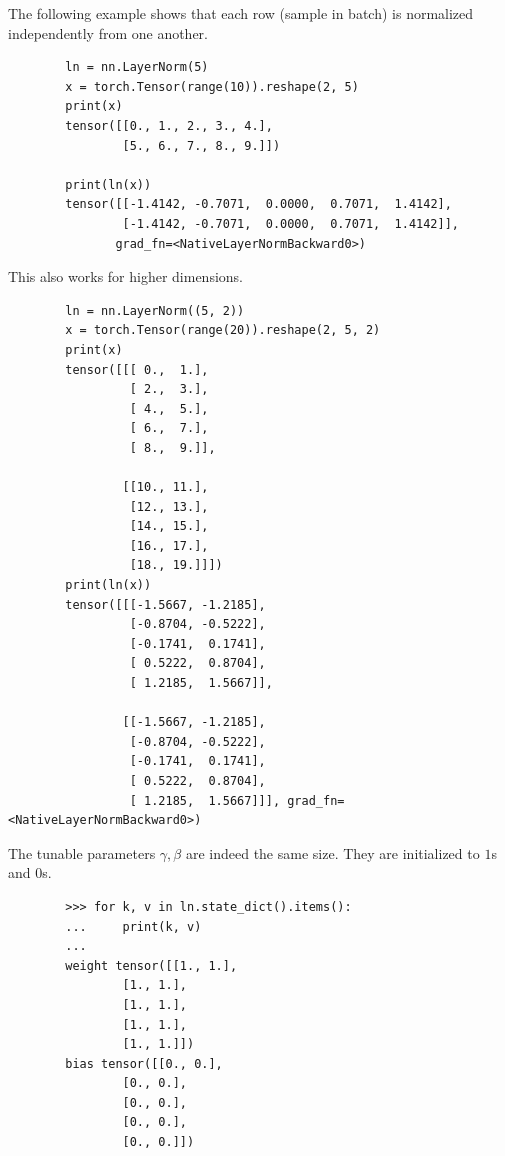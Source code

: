     \begin{example}
      The following example shows that each row (sample in batch) is normalized independently from one another. 
      \begin{lstlisting}
        ln = nn.LayerNorm(5)
        x = torch.Tensor(range(10)).reshape(2, 5)
        print(x)
        tensor([[0., 1., 2., 3., 4.],
                [5., 6., 7., 8., 9.]])

        print(ln(x))
        tensor([[-1.4142, -0.7071,  0.0000,  0.7071,  1.4142],
                [-1.4142, -0.7071,  0.0000,  0.7071,  1.4142]],
               grad_fn=<NativeLayerNormBackward0>)
      \end{lstlisting}
      This also works for higher dimensions. 
      \begin{lstlisting}
        ln = nn.LayerNorm((5, 2))
        x = torch.Tensor(range(20)).reshape(2, 5, 2)
        print(x)
        tensor([[[ 0.,  1.],
                 [ 2.,  3.],
                 [ 4.,  5.],
                 [ 6.,  7.],
                 [ 8.,  9.]],

                [[10., 11.],
                 [12., 13.],
                 [14., 15.],
                 [16., 17.],
                 [18., 19.]]])
        print(ln(x))
        tensor([[[-1.5667, -1.2185],
                 [-0.8704, -0.5222],
                 [-0.1741,  0.1741],
                 [ 0.5222,  0.8704],
                 [ 1.2185,  1.5667]],

                [[-1.5667, -1.2185],
                 [-0.8704, -0.5222],
                 [-0.1741,  0.1741],
                 [ 0.5222,  0.8704],
                 [ 1.2185,  1.5667]]], grad_fn=<NativeLayerNormBackward0>)
      \end{lstlisting}
      The tunable parameters $\gamma, \beta$ are indeed the same size. They are initialized to $1$s and $0$s. 
        \begin{lstlisting}
        >>> for k, v in ln.state_dict().items(): 
        ...     print(k, v)
        ... 
        weight tensor([[1., 1.],
                [1., 1.],
                [1., 1.],
                [1., 1.],
                [1., 1.]])
        bias tensor([[0., 0.],
                [0., 0.],
                [0., 0.],
                [0., 0.],
                [0., 0.]])
      \end{lstlisting}
    \end{example}

